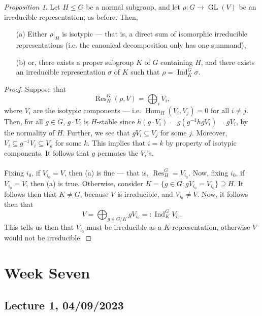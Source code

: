 \documentclass[a4paper]{report}
\theoremstyle{definition}
\theoremstyle{remark}
\theoremstyle{proposition}
\newtheorem{proposition}{Proposition}
\theoremstyle{conjecture}
\theoremstyle{lemma}
\theoremstyle{corollary}
\theoremstyle{exercise}
\theoremstyle{example}
\newcommand{\on}{\operatorname}
\begin{document}
\begin{proposition}\label{prop15}
    Let $H \leq G$ be a normal subgroup, and let $\rho: G \to \on{GL}(V)$ be 
    an irreducible representation, as before. Then,
    \begin{itemize}
        \item[(a)] Either $\rho\vert_H$ is isotypic --- that is, a direct 
            sum of isomorphic irreducible representations (i.e. the canonical 
            decomposition only has one summand),
        \item[(b)] or, there exists a proper subgroup $K$ of $G$ 
            containing $H$, and there exists an irreducible 
            representation $\sigma$ of $K$ such that 
            $\rho = \on{Ind}_K^G\sigma$.
    \end{itemize}
\end{proposition}

\begin{proof}
    Suppose that $$\on{Res}_H^G(\rho,V) = \bigoplus_i V_i,$$ where $V_i$ are 
    the isotypic components --- i.e. $\on{Hom}_H(V_i,V_j) = 0$ for all $i\neq j$.
    Then, for all $g \in G$, $g\cdot V_i$ is $H$-stable since 
    $h(g\cdot V_i) = g(g^{-1}hgV_i) = gV_i$, by the normality of $H$.
    Further, we see that $gV_i \subseteq V_j$ for some $j$. 
    Moreover, $V_i \subseteq g^{-1}V_i \subseteq V_k$ for some $k$.
    This implies that $i=k$ by property of isotypic components.
    It follows that $g$ permutes the $V_i$'s.\\\\
    Fixing $i_0$, if $V_{i_0} = V$, then (a) is fine --- that is, 
    $\on{Res}_H^G = V_{i_0}$.
    Now, fixing $i_0$, if $V_{i_0} = V$, then (a) is true.
    Otherwise, consider 
    $K = \lbrace g\in G :gV_{i_0} = V_{i_0}\rbrace \supseteq H$.
    It follows then that $K \neq G$, because $V$ is irreducible, and 
    $V_{i_0}\neq V$. Now, it follows then that 
    $$V = \bigoplus_{g\in G/K} gV_{i_0} =: \on{Ind}_K^GV_{i_0}.$$
    This tells us then that $V_{i_0}$ must be irreducible as a 
    $K$-representation, otherwise $V$ would not be irreducible.
\end{proof}


\chapter{Week Seven}

\section{Lecture 1, 04/09/2023}
\end{document}
